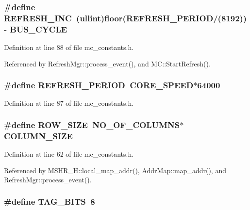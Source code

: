 \subsubsection[{REFRESH\_\-INC}]{\setlength{\rightskip}{0pt plus 5cm}\#define {\bf REFRESH\_\-INC}~({\bf ullint})floor({\bf REFRESH\_\-PERIOD}/(8192)) - {\bf BUS\_\-CYCLE}}\label{mc__constants_8h_aebf6da1474d52a416fbf00608e500cd}




Definition at line 88 of file mc\_\-constants.h.

Referenced by RefreshMgr::process\_\-event(), and MC::StartRefresh().
\subsubsection[{REFRESH\_\-PERIOD}]{\setlength{\rightskip}{0pt plus 5cm}\#define {\bf REFRESH\_\-PERIOD}~{\bf CORE\_\-SPEED}$\ast$64000}\label{mc__constants_8h_4ca70e92b8b779d01eed94f5f07a03ed}




Definition at line 87 of file mc\_\-constants.h.
\subsubsection[{ROW\_\-SIZE}]{\setlength{\rightskip}{0pt plus 5cm}\#define {\bf ROW\_\-SIZE}~{\bf NO\_\-OF\_\-COLUMNS}$\ast${\bf COLUMN\_\-SIZE}}\label{mc__constants_8h_a4d030604a90c8d019d90fc721900d63}




Definition at line 62 of file mc\_\-constants.h.

Referenced by MSHR\_\-H::local\_\-map\_\-addr(), AddrMap::map\_\-addr(), and RefreshMgr::process\_\-event().
\subsubsection[{TAG\_\-BITS}]{\setlength{\rightskip}{0pt plus 5cm}\#define {\bf TAG\_\-BITS}~8}\label{mc__constants_8h_273bfff4ad6c875e1d4ca56b70a23137}




